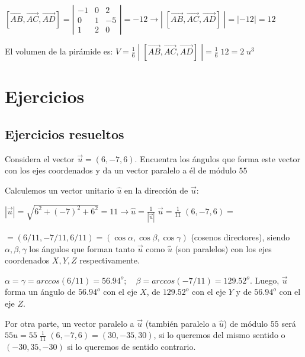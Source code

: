 \noindent $[\overrightarrow{AB}, \overrightarrow{AC}, \overrightarrow{AD}]= \left| \begin{matrix} -1&0&2\\0&1&-5\\1&2&0 \end{matrix} \right|=-12 \to |\; [\overrightarrow{AB}, \overrightarrow{AC}, \overrightarrow{AD}]\;|=|-12|=12$

\noindent El volumen de la pirámide es: $V=\frac 1 6 \; |\; [\overrightarrow{AB}, \overrightarrow{AC}, \overrightarrow{AD}]\;| = \frac 1 6 \; 12=2\; u^3$
	

\section {Ejercicios}

\subsection {Ejercicios resueltos}

\begin{ejre}
	Considera el vector $\vec u=(6,-7,6)$. Encuentra los ángulos que forma este vector con los ejes coordenados y da un vector paralelo a él de módulo $55$
\end{ejre}

\begin{proofw}\renewcommand{\qedsymbol}{$\diamond$}
	Calculemos un vector unitario $\hat u$ en la dirección de $\vec u$:
	
\noindent $|\vec u|=\sqrt{6^2+(-7)^2+6^2}=11 \to \hat u = \frac 1 {|\vec u|}\; \vec u= \frac 1 {11}\; (6,-7,6)=$ 

\noindent $=(6/11,-7/11,6/11)=(\cos \alpha, \cos \beta, \cos \gamma)$ (cosenos directores), siendo $\alpha, \beta, \gamma$ los ángulos que forman tanto $\vec u$ como $\hat u$ (son paralelos) con los ejes coordenados $X,Y,Z$ respectivamente.

\noindent $\alpha=\gamma= arc cos (6/11)=56.94^o; \quad \beta= arc cos (-7/11)=129.52^o$. Luego, $\vec u$ forma un ángulo de $56.94^o$ con el eje $X$, de $129.52^o$ con el eje $Y$ y de $56.94^o$ con el eje $Z$.

\noindent Por otra parte, un vector paralelo a $\vec u$ (también paralelo a $\hat u$) de módulo $55$ será $55\hat u=55 \; \frac 1 {11}\; (6,-7,6)=(30,-35,30)$, si lo queremos del mismo sentido o $(-30,35,-30)$ si lo queremos de sentido contrario. 
\end{proofw}
	
